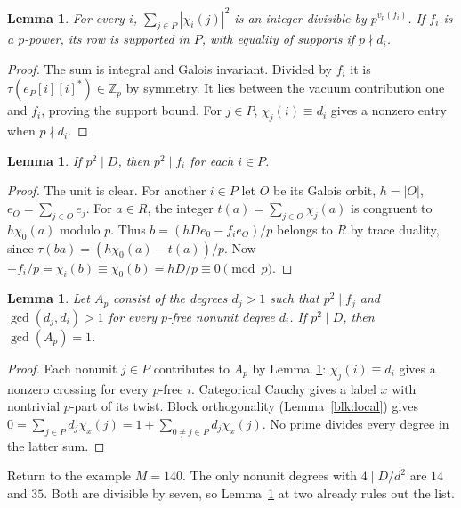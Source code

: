 \documentclass[11pt]{amsart}
\numberwithin{equation}{section}
\newtheorem{lemma}[theorem]{Lemma}
\newcommand{\ZZ}{\mathbb Z}
\begin{document}
\begin{lemma}\label{blk:support}
For every $i$, $\sum_{j\in P}|\chi_i(j)|^2$ is an integer divisible by
$p^{v_p(f_i)}$. If $f_i$ is a $p$-power, its row is supported in $P$,
with equality of supports if $p\nmid d_i$.
\end{lemma}
\begin{proof}
The sum is integral and Galois invariant. Divided by $f_i$ it is
$\tau(e_P[i][i]^*)\in\ZZ_p$ by symmetry. It lies between the vacuum
contribution one and $f_i$, proving the support bound. For $j\in P$,
$\chi_j(i)\equiv d_i$ gives a nonzero entry when $p\nmid d_i$.
\end{proof}

\begin{lemma}\label{blk:height}
If $p^2\mid D$, then $p^2\mid f_i$ for each $i\in P$.
\end{lemma}
\begin{proof}
The unit is clear. For another $i\in P$ let $O$ be its Galois orbit,
$h=|O|$, $e_O=\sum_{j\in O}e_j$. For $a\in R$, the integer
$t(a)=\sum_{j\in O}\chi_j(a)$ is congruent to $h\chi_0(a)$ modulo $p$.
Thus $b=(hD e_0-f_i e_O)/p$ belongs to $R$ by trace duality, since
$\tau(ba)=(h\chi_0(a)-t(a))/p$. Now
$-f_i/p=\chi_i(b)\equiv\chi_0(b)=hD/p\equiv0\pmod p$.
\end{proof}

\begin{lemma}\label{blk:witness}
Let $A_p$ consist of the degrees $d_j>1$ such that $p^2\mid f_j$ and
$\gcd(d_j,d_i)>1$ for every $p$-free nonunit degree $d_i$. If $p^2\mid D$,
then $\gcd(A_p)=1$.
\end{lemma}
\begin{proof}
Each nonunit $j\in P$ contributes to $A_p$ by Lemma~\ref{blk:height}:
$\chi_j(i)\equiv d_i$ gives a nonzero crossing for every $p$-free $i$.
Categorical Cauchy gives a label $x$ with nontrivial $p$-part of its twist.
Block orthogonality (Lemma~\ref{blk:local}) gives
$0=\sum_{j\in P}d_j\chi_x(j)=1+\sum_{0\ne j\in P}d_j\chi_x(j)$.
No prime divides every degree in the latter sum.
\end{proof}

Return to the example $M=140$. The only nonunit degrees with
$4\mid D/d^2$ are $14$ and $35$. Both are divisible by seven, so
Lemma~\ref{blk:witness} at two already rules out the list.
\end{document}
